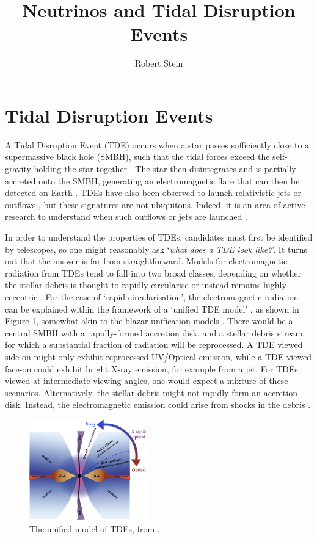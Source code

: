 \documentclass[a4paper,11pt]{article}
\title{Neutrinos and Tidal Disruption Events}
\author*[a, b]{Robert Stein}
\affiliation[a]{Deutsches Elektronen-Synchrotron DESY: Zeuthen, Germany}
\affiliation[b]{Institut f\"ur Physik, Humboldt-Universit\"t zu Berlin: Berlin, Germany}
\begin{document}
\maketitle


\section{Tidal Disruption Events}

A Tidal Disruption Event (TDE) occurs when a star passes sufficiently close to a supermassive black hole (SMBH), such that the tidal forces exceed the self-gravity holding the star together \cite{rees_tde_88}. The star then disintegrates and is partially accreted onto the SMBH, generating an electromagnetic flare that can then be detected on Earth \cite{gezari_21}. TDEs have also been observed to launch relativistic jets \cite{swift_j1644_11} or outflows \cite{van_velzen_16, alexander_16, radio_tde_summary}, but these signatures are not ubiquitous. Indeed, it is an area of active research to understand when such outflows or jets are launched \cite{radio_tde_summary}.

In order to understand the properties of TDEs, candidates must first be identified by telescopes, so one might reasonably ask `\emph{what does a TDE look like?}'. It turns out that the answer is far from straightforward. Models for electromagnetic radiation from TDEs tend to fall into two broad classes, depending on whether the stellar debris is thought to rapidly circularise or instead remains highly eccentric \cite{roth_20}. For the case of `rapid circularisation', the electromagnetic radiation can be explained within the framework of a `unified TDE model' \cite{dai_18}, as shown in Figure \ref{fig:tde_dai}, somewhat akin to the blazar unification models \cite{95_agn_unification}. There would be a central SMBH with a rapidly-formed accretion disk, and a stellar debris stream, for which a substantial fraction of radiation will be reprocessed. A TDE viewed side-on might only exhibit reprocessed UV/Optical emission, while a TDE viewed face-on could exhibit bright X-ray emission, for example from a jet. For TDEs viewed at intermediate viewing angles, one would expect a mixture of these scenarios. Alternatively, the stellar debris might not rapidly form an accretion disk. Instead, the electromagnetic emission could arise from shocks in the debris \cite{roth_20}. 

\begin{figure}[!ht]
	\centering \includegraphics[width=0.45\textwidth]{figures/dai_unified_model}
	\caption{The unified model of TDEs, from \cite{dai_18}.}
	\label{fig:tde_dai}
\end{figure}
\end{document}
